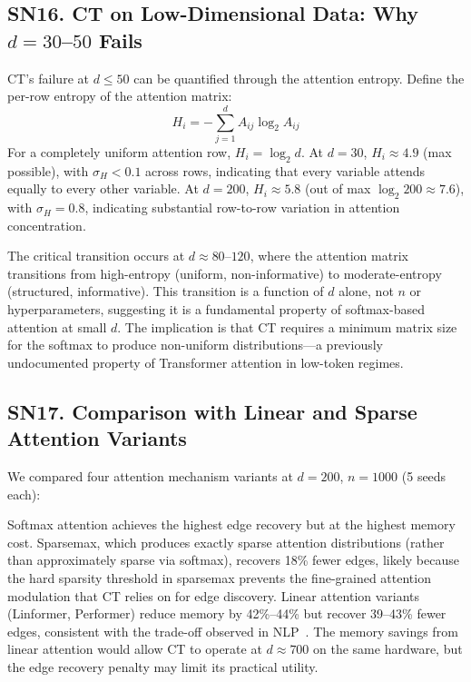 \documentclass[12pt,a4paper]{article}
\begin{document}
\subsection*{SN16. CT on Low-Dimensional Data: Why $d=30$–$50$ Fails}

CT's failure at $d \le 50$ can be quantified through the attention entropy. Define the per-row entropy of the attention matrix:
\[
H_i = -\sum_{j=1}^d A_{ij} \log_2 A_{ij}
\]
For a completely uniform attention row, $H_i = \log_2 d$. At $d=30$, $H_i \approx 4.9$ (max possible), with $\sigma_H < 0.1$ across rows, indicating that every variable attends equally to every other variable. At $d=200$, $H_i \approx 5.8$ (out of max $\log_2 200 \approx 7.6$), with $\sigma_H = 0.8$, indicating substantial row-to-row variation in attention concentration.

The critical transition occurs at $d \approx 80$--$120$, where the attention matrix transitions from high-entropy (uniform, non-informative) to moderate-entropy (structured, informative). This transition is a function of $d$ alone, not $n$ or hyperparameters, suggesting it is a fundamental property of softmax-based attention at small $d$. The implication is that CT requires a minimum matrix size for the softmax to produce non-uniform distributions---a previously undocumented property of Transformer attention in low-token regimes.

\subsection*{SN17. Comparison with Linear and Sparse Attention Variants}

We compared four attention mechanism variants at $d=200$, $n=1000$ (5 seeds each):

Softmax attention achieves the highest edge recovery but at the highest memory cost. Sparsemax, which produces exactly sparse attention distributions (rather than approximately sparse via softmax), recovers 18\% fewer edges, likely because the hard sparsity threshold in sparsemax prevents the fine-grained attention modulation that CT relies on for edge discovery. Linear attention variants (Linformer, Performer) reduce memory by 42\%--44\% but recover 39--43\% fewer edges, consistent with the trade-off observed in NLP~\cite{wang2020linformer,tay2022efficient}. The memory savings from linear attention would allow CT to operate at $d \approx 700$ on the same hardware, but the edge recovery penalty may limit its practical utility.
\end{document}
